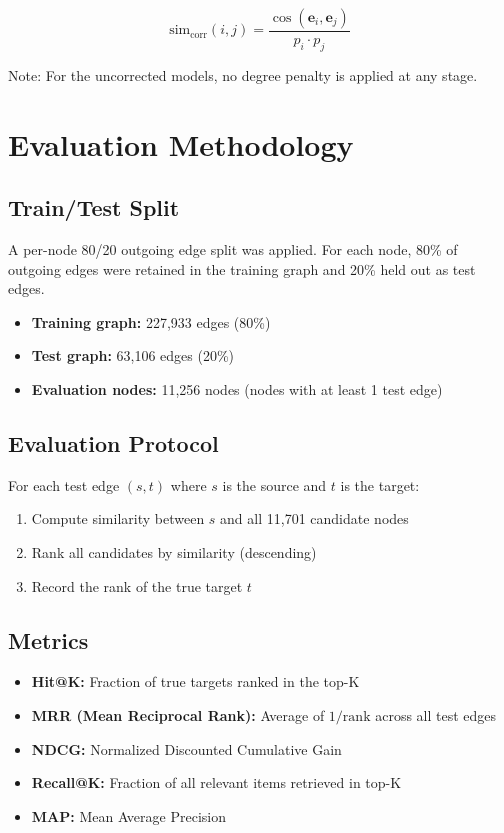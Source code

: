 \documentclass[12pt,a4paper]{article}
\begin{document}
\[
\text{sim}_{\text{corr}}(i,j) = \frac{\cos(\mathbf{e}_i, \mathbf{e}_j)}{p_i \cdot p_j}
\]

Note: For the uncorrected models, no degree penalty is applied at any stage.

\section{Evaluation Methodology}

\subsection{Train/Test Split}

A per-node 80/20 outgoing edge split was applied.  For each node, 80\% of outgoing
edges were retained in the training graph and 20\% held out as test edges.

\begin{itemize}
    \item \textbf{Training graph:} 227,933 edges (80\%)
    \item \textbf{Test graph:} 63,106 edges (20\%)
    \item \textbf{Evaluation nodes:} 11,256 nodes (nodes with at least 1 test edge)
\end{itemize}

\subsection{Evaluation Protocol}

For each test edge $(s, t)$ where $s$ is the source and $t$ is the target:
\begin{enumerate}
    \item Compute similarity between $s$ and all 11,701 candidate nodes
    \item Rank all candidates by similarity (descending)
    \item Record the rank of the true target $t$
\end{enumerate}

\subsection{Metrics}

\begin{itemize}
    \item \textbf{Hit@K:} Fraction of true targets ranked in the top-K
    \item \textbf{MRR (Mean Reciprocal Rank):} Average of $1/\text{rank}$ across all test edges
    \item \textbf{NDCG:} Normalized Discounted Cumulative Gain
    \item \textbf{Recall@K:} Fraction of all relevant items retrieved in top-K
    \item \textbf{MAP:} Mean Average Precision
\end{itemize}
\end{document}
